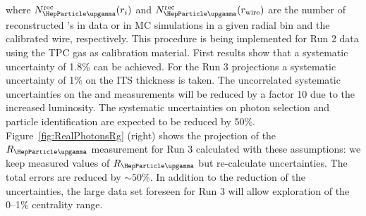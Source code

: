 where $N_{\PGg}^{\rm rec}(r_i)$ and $N_{\PGg}^{\rm rec}(r_{\rm wire})$ are the number of reconstructed \PGg 's in data or in MC simulations in a given radial bin and the calibrated wire, respectively.
This procedure is being implemented for Run 2 data using the TPC gas as calibration material. First results show that a systematic uncertainty of 1.8\% can be achieved. For the Run 3 projections a systematic uncertainty of 1\% on the ITS thickness is taken. The uncorrelated systematic uncertainties on the \PGpz and \PGh measurements will be reduced by a factor 10 due to the increased luminosity. The systematic uncertainties on photon selection and particle identification are expected to be reduced by 50\%.
Figure~\ref{fig:RealPhotonsRg} (right) shows the projection of the $R_{\PGg}$ measurement 
for Run 3 calculated with these assumptions: we keep measured values of $R_{\PGg}$ but re-calculate uncertainties. The total errors are reduced by $\sim50$\%. In addition to the reduction of the uncertainties, the large data set foreseen for Run 3 will allow exploration of the 0--1\% centrality range. 





